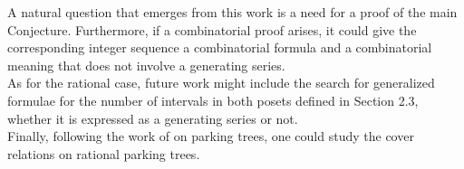 

A natural question that emerges from this work is a need
for a proof of the main Conjecture.
Furthermore, if a combinatorial proof arises, it could give
the corresponding integer sequence a combinatorial formula
and a combinatorial meaning that does not involve a 
generating series.\\

As for the rational case, future work might include the search
for generalized formulae for the number of intervals in both
posets defined in Section 2.3, whether it is expressed as a
generating series or not.\\

Finally, following the work of \cite{ref9} on parking trees,
one could study the cover relations on rational parking trees. 